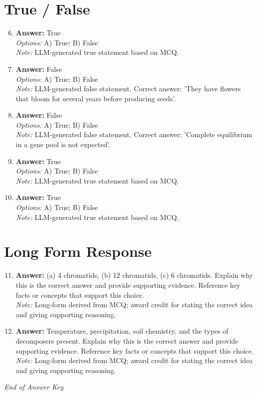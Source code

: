 \documentclass[12pt]{article}
\begin{document}
\section*{True / False}
\begin{enumerate}[label=\arabic*.]
\setcounter{enumi}{5}
\item \textbf{Answer:} True
\\ \textit{Options:} A) True; B) False
\\ \textit{Note:} LLM-generated true statement based on MCQ.
\item \textbf{Answer:} False
\\ \textit{Options:} A) True; B) False
\\ \textit{Note:} LLM-generated false statement. Correct answer: 'They have flowers that bloom for several years before producing seeds'.
\item \textbf{Answer:} False
\\ \textit{Options:} A) True; B) False
\\ \textit{Note:} LLM-generated false statement. Correct answer: 'Complete equilibrium in a gene pool is not expected'.
\item \textbf{Answer:} True
\\ \textit{Options:} A) True; B) False
\\ \textit{Note:} LLM-generated true statement based on MCQ.
\item \textbf{Answer:} True
\\ \textit{Options:} A) True; B) False
\\ \textit{Note:} LLM-generated true statement based on MCQ.
\end{enumerate}

\section*{Long Form Response}
\begin{enumerate}[label=\arabic*.]
\setcounter{enumi}{10}
\item \textbf{Answer:} (a) 4 chromatids, (b) 12 chromatids, (c) 6 chromatids. Explain why this is the correct answer and provide supporting evidence. Reference key facts or concepts that support this choice.
\\ \textit{Note:} Long-form derived from MCQ; award credit for stating the correct idea and giving supporting reasoning.
\item \textbf{Answer:} Temperature, precipitation, soil chemistry, and the types of decomposers present. Explain why this is the correct answer and provide supporting evidence. Reference key facts or concepts that support this choice.
\\ \textit{Note:} Long-form derived from MCQ; award credit for stating the correct idea and giving supporting reasoning.
\end{enumerate}

\vfill
\noindent\textit{End of Answer Key}
\end{document}
